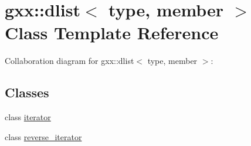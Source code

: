 \hypertarget{classgxx_1_1dlist}{}\section{gxx\+:\+:dlist$<$ type, member $>$ Class Template Reference}
\label{classgxx_1_1dlist}


Collaboration diagram for gxx\+:\+:dlist$<$ type, member $>$\+:
\subsection*{Classes}
\begin{DoxyCompactItemize}
\item 
class \hyperlink{classgxx_1_1dlist_1_1iterator}{iterator}
\item 
class \hyperlink{classgxx_1_1dlist_1_1reverse__iterator}{reverse\+\_\+iterator}
\end{DoxyCompactItemize}
